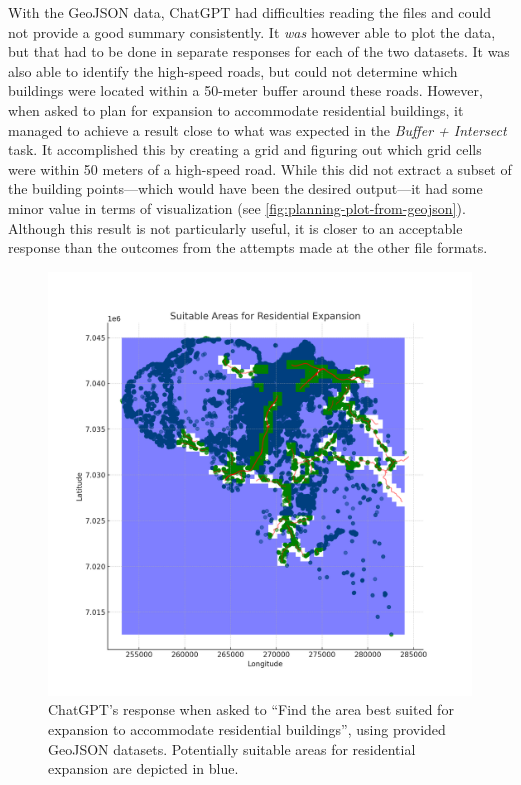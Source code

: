 With the GeoJSON data, ChatGPT had difficulties reading the files and could not provide a good summary consistently. It \textit{was} however able to plot the data, but that had to be done in separate responses for each of the two datasets. It was also able to identify the high-speed roads, but could not determine which buildings were located within a 50-meter buffer around these roads. However, when asked to plan for expansion to accommodate residential buildings, it managed to achieve a result close to what was expected in the \textit{Buffer + Intersect} task. It accomplished this by creating a grid and figuring out which grid cells were within 50 meters of a high-speed road. While this did not extract a subset of the building points---which would have been the desired output---it had some minor value in terms of visualization (see \autoref{fig:planning-plot-from-geojson}). Although this result is not particularly useful, it is closer to an acceptable response than the outcomes from the attempts made at the other file formats.

\begin{figure}
    \centering
    \includegraphics[width=\textwidth]{../figs/residential_expansion_areas_map.png}
    \caption{ChatGPT's response when asked to \enquote{Find the area best suited for expansion to accommodate residential buildings}, using provided GeoJSON datasets. Potentially suitable areas for residential expansion  are depicted in blue.}
    \label{fig:planning-plot-from-geojson}
\end{figure}


